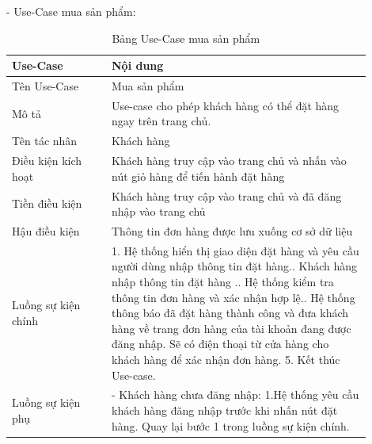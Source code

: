 - Use-Case mua sản phẩm:
\begin{longtable}[htp]{ |m{0.25\linewidth}|m{0.65\linewidth}|}
 \caption{Bảng Use-Case mua sản phẩm \label{long}}\\
 \hline
 Use-Case & Nội dung \\
 \hline
 Tên Use-Case & Mua sản phẩm \\
 \hline
 Mô tả & Use-case cho phép khách hàng có thể đặt hàng ngay trên trang chủ.\\
 \hline
 Tên tác nhân & Khách hàng\\
 \hline
 Điều kiện kích hoạt & Khách hàng truy cập vào trang chủ và nhấn vào nút giỏ hàng để tiến hành đặt hàng \\
 \hline
 Tiền điều kiện & Khách hàng truy cập vào trang chủ và đã đăng nhập vào trang chủ\\
 \hline
 Hậu điều kiện & Thông tin đơn hàng được lưu xuống cơ sở dữ liệu\\
 \hline
 Luồng sự kiện chính & 
  1. Hệ thống hiển thị giao diện đặt hàng và yêu cầu người dùng nhập thông tin đặt hàng.\newline
  2. Khách hàng nhập thông tin đặt hàng .\newline
  3. Hệ thống kiểm tra thông tin đơn hàng và xác nhận hợp lệ.\newline
  4. Hệ thống thông báo đã đặt hàng thành công và đưa khách hàng về trang đơn hàng của tài khoản đang được đăng nhập\newline
  5. Sẽ có điện thoại từ cửa hàng cho khách hàng để xác nhận đơn hàng.
  5. Kết thúc Use-case.	
 \\
 \hline
 Luồng sự kiện phụ & 
 - Khách hàng chưa đăng nhập:\newline
 1.Hệ thống yêu cầu khách hàng đăng nhập trước khi nhấn nút đặt hàng.\newline
  Quay lại bước 1 trong luồng sự kiện chính.
 \\
 \hline
\end{longtable}

